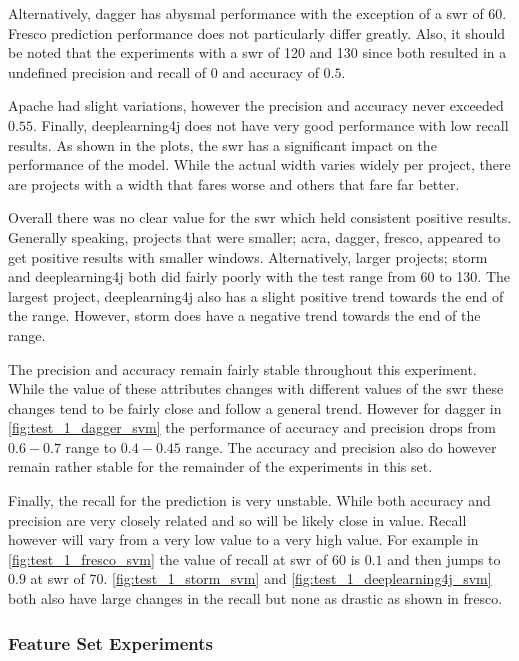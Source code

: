 Alternatively, dagger has abysmal performance with the exception of a \gls{swr} of 60. Fresco prediction performance does not particularly differ greatly. Also, it should be noted that the experiments with a \gls{swr} of 120 and 130 since both resulted in a undefined precision and recall of 0 and accuracy of $0.5$.

Apache had slight variations, however the precision and accuracy never exceeded $0.55$. Finally, deeplearning4j does not have very good performance with low recall results. As shown in the plots, the \gls{swr} has a significant impact on the performance of the model. While the actual width varies widely per project, there are projects with a width that fares worse and others that fare far better.

Overall there was no clear value for the \gls{swr} which held consistent positive results. Generally speaking, projects that were smaller; acra, dagger, fresco, appeared to get positive results with smaller windows. Alternatively, larger projects; storm and deeplearning4j both did fairly poorly with the test range from 60 to 130. The largest project, deeplearning4j also has a slight positive trend towards the end of the range. However, storm does have a negative trend towards the end of the range.

The precision and accuracy remain fairly stable throughout this experiment. While the value of these attributes changes with different values of the \gls{swr} these changes tend to be fairly close and follow a general trend. However for dagger in \autoref{fig:test_1_dagger_svm} the performance of accuracy and precision drops from $0.6 - 0.7$ range to $0.4 - 0.45$ range. The accuracy and precision also do however remain rather stable for the remainder of the experiments in this set.

Finally, the recall for the prediction is very unstable. While both accuracy and precision are very closely related and so will be likely close in value. Recall however will vary from a very low value to a very high value. For example in \autoref{fig:test_1_fresco_svm} the value of recall at \gls{swr} of $60$ is $0.1$ and then jumps to $0.9$ at \gls{swr} of $70$. \autoref{fig:test_1_storm_svm} and \autoref{fig:test_1_deeplearning4j_svm} both also have large changes in the recall but none as drastic as shown in fresco. 

    
\subsubsection{Feature Set Experiments}
\label{sec:svm_feature_set_experiments}


